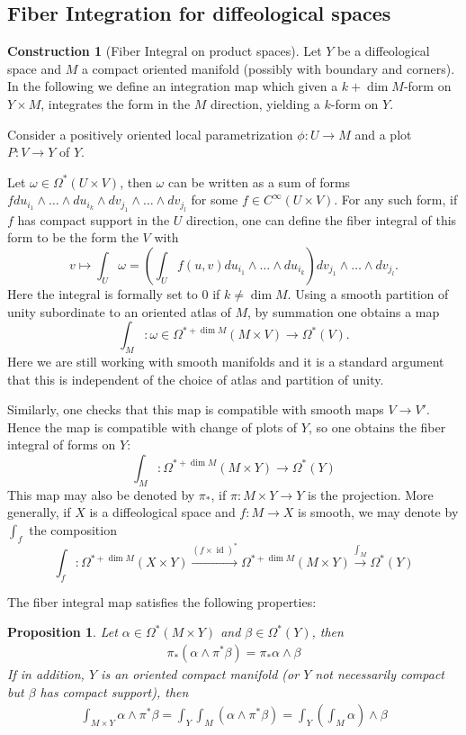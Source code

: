 \documentclass{scrartcl}
\theoremstyle{plain}
\newtheorem{proposition}[theorem]{Proposition}
\theoremstyle{definition}
\newtheorem{construction}[theorem]{Construction}
\let\xto\xrightarrow
\DeclareMathOperator{\id}{id}
\begin{document}
\subsection{Fiber Integration for diffeological spaces}
\begin{construction}[Fiber Integral on product spaces]
Let $Y$ be a diffeological space and $M$ a compact oriented manifold (possibly with boundary and corners). In the following we define an integration map which given a $k+\dim M$-form on $Y\times M$, integrates the form in the $M$ direction, yielding a $k$-form on $Y$.

Consider a positively oriented local parametrization $\phi\colon U\to M$ and a plot $P\colon V\to Y$ of $Y$.

Let $\omega\in\Omega^*(U\times V)$, then $\omega$ can be written as a sum of forms $f du_{i_1}\wedge\dots \wedge du_{i_k}\wedge dv_{j_1}\wedge\dots\wedge dv_{j_l}$ for some $f\in C^\infty(U\times V)$. For any such form, if $f$ has compact support in the $U$ direction, one can define the fiber integral of this form to be the form the $V$ with $$v\mapsto \int_U \omega = \left(\int_U f(u, v) du_{i_1}\wedge\dots \wedge du_{i_k} \right) dv_{j_1}\wedge\dots\wedge dv_{j_l}.$$
Here the integral is formally set to $0$ if $k\neq \dim M$. Using a smooth partition of unity subordinate to an oriented atlas of $M$, by summation one obtains a map $$\int_M\colon\omega\in\Omega^{*+\dim M}(M\times V)\to\Omega^*(V).$$
Here we are still working with smooth manifolds and it is a standard argument that this is independent of the choice of atlas and partition of unity. 

Similarly, one checks that this map is compatible with smooth maps $V\to V'$. Hence the map is compatible with change of plots of $Y$, so one obtains the fiber integral of forms on $Y$:
$$\int_M\colon \Omega^{*+\dim M}(M\times Y)\to \Omega^*(Y)$$
This map may also be denoted by $\pi_*$, if $\pi\colon M\times Y\to Y$ is the projection. More generally, if $X$ is a diffeological space and $f\colon M\to X$ is smooth, we may denote by $\int_f$ the composition 
$$\int_f \colon \Omega^{*+\dim M}(X\times Y)\xto{(f\times \id)^*} \Omega^{*+\dim M}(M\times Y) \xto{\int_M} \Omega^*(Y)$$
\end{construction}
The fiber integral map satisfies the following properties:
\begin{proposition}
    Let $\alpha\in\Omega^*(M\times Y)$ and $\beta\in\Omega^*(Y)$, then
    \begin{align*}
        \pi_*(\alpha\wedge\pi^*\beta) = \pi_*\alpha\wedge\beta
    \end{align*}
    If in addition, $Y$ is an oriented compact manifold (or $Y$ not necessarily compact but $\beta$ has compact support), then
    \begin{align*}
        \int_{M\times Y} \alpha\wedge\pi^*\beta = \int_Y\int_M \left(\alpha\wedge\pi^*\beta\right) =  \int_Y\left(\int_M \alpha\right)\wedge\beta
    \end{align*}
\end{proposition}
\end{document}
